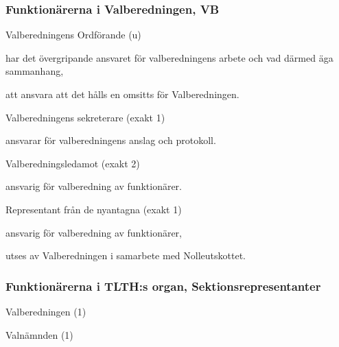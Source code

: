 \documentclass[10pt]{article}
\begin{document}
\subsubsection{Funktionärerna i Valberedningen, VB}

\begin{emptylist}
    \item Valberedningens Ordförande (u)
        \begin{dashlist}
            \item har det övergripande ansvaret för valberedningens arbete
                och vad därmed äga sammanhang,
            \item att ansvara att det hålls en omsitts för Valberedningen.
        \end{dashlist}
    \item Valberedningens sekreterare (exakt 1)
        \begin{dashlist}
            \item ansvarar för valberedningens anslag och protokoll.
        \end{dashlist}
    \item Valberedningsledamot (exakt 2)
        \begin{dashlist}
            \item ansvarig för valberedning av funktionärer.
        \end{dashlist}
    \item Representant från de nyantagna (exakt 1)
        \begin{dashlist}
            \item ansvarig för valberedning av funktionärer,
            \item utses av Valberedningen i samarbete med Nolleutskottet.
        \end{dashlist}
\end{emptylist}

\subsubsection{Funktionärerna i TLTH:s organ, Sektionsrepresentanter}
\begin{emptylist}
    \item Valberedningen (1)
    \item Valnämnden (1)
\end{emptylist}
\end{document}
